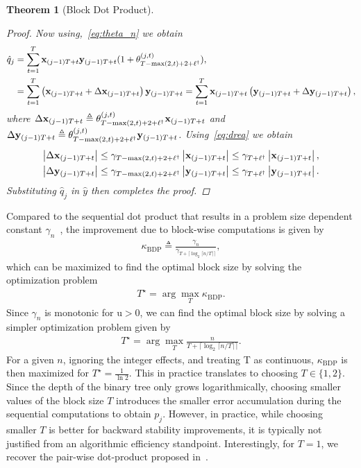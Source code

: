 \documentclass[11pt,draft]{article}
\newcommand{\urd}{\ensuremath{\mathrm{u}}}
\newcommand{\define}{\ensuremath{\triangleq}}
\newcommand{\vect}[1]{\mathbf{\MakeLowercase{#1}}}
\newtheorem{theorem}{Theorem}[section]
\theoremstyle{definition}
\theoremstyle{remark}
\newcommand{\abs}[1]{\left|#1\right|}
\begin{document}
\begin{theorem}[Block Dot Product]
\begin{proof}
    Now using,~\cref{eq:theta_n} we obtain
    \begin{align}
       \hat{q}_j &= \sum_{t=1}^T \vect{x}_{(j-1)T + t}\vect{y}_{(j-1)T + t} (1 + \theta_{T - \max(2, t) + 2 + \ell^\dagger}^{(j,t)}),\\
       &= \sum_{t=1}^T \left(\vect{x}_{(j-1)T + t} + \Delta \vect{x}_{(j-1)T + t}\right)\vect{y}_{(j-1)T + t} =  \sum_{t=1}^T\vect{x}_{(j-1)T + t}\left(\vect{y}_{(j-1)T + t} + \Delta \vect{y}_{(j-1)T + t}\right),
    \end{align}
    where $\Delta \vect{x}_{(j-1)T + t} \define \theta_{T - \max(2, t) + 2 + \ell^\dagger}^{(j,t)} \vect{x}_{(j-1)T + t}$ and $\Delta \vect{y}_{(j-1)T + t} \define \theta_{T - \max(2, t) + 2 + \ell^\dagger}^{(j,t)} \vect{y}_{(j-1)T + t}$.
    Using~\cref{eq:drea} we obtain 
    \begin{align}
        \abs{\Delta \vect{x}_{(j-1)T + t}} \leq \gamma_{T - \max(2, t) + 2 + \ell^\dagger} \abs{\vect{x}_{(j-1)T + t}} \leq \gamma_{T + \ell^\dagger}\abs{\vect{x}_{(j-1)T + t}},\\
        \abs{\Delta \vect{y}_{(j-1)T + t}} \leq \gamma_{T - \max(2, t) + 2 + \ell^\dagger} \abs{\vect{y}_{(j-1)T + t}}\leq \gamma_{T + \ell^\dagger}\abs{\vect{y}_{(j-1)T + t}}.
    \end{align}
    Substituting $\hat{q}_j$ in $\hat{y}$ then completes the proof.
    \end{proof}
\end{theorem}

Compared to the sequential dot product that results in a problem size dependent constant $\gamma_{n}$~\cite{higham2002accuracy}, the improvement due to block-wise computations is given by
\begin{align}
    \kappa_{\mathrm{BDP}} \define \frac{\gamma_n}{\gamma_{T + \lceil \log_2 \lceil n / T \rceil \rceil}},
\end{align}
which can be maximized to find the optimal block size by solving the optimization problem
\begin{align}
    T^\star = \arg\max_T \kappa_{\mathrm{BDP}}.
\end{align}
Since $\gamma_{n}$ is monotonic for $\urd > 0$, we can find the optimal block size by solving a simpler optimization problem given by
\begin{align}
    T^\star = \arg\max_T \frac{n}{T + \lceil \log_2 \lceil n / T \rceil \rceil}.
\end{align}
For a given $n$, ignoring the integer effects, and treating T as continuous, $\kappa_{\mathrm{BDP}}$ is then maximized for $T^\star = \frac{1}{\ln 2}$.
This in practice translates to choosing $T \in \{1, 2\}$.
Since the depth of the binary tree only grows logarithmically, choosing smaller values of the block size $T$ introduces the smaller error accumulation during the sequential computations to obtain $p_j$.
However, in practice, while choosing smaller $T$ is better for backward stability improvements, it is typically not justified from an algorithmic efficiency standpoint.
Interestingly, for $T=1$, we recover the pair-wise dot-product proposed in~\cite[p. 64]{higham2002accuracy}.
\end{document}
